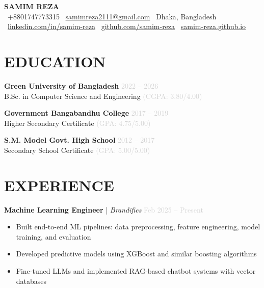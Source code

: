 \documentclass[a4paper,10pt]{article}
\begin{document}
\begin{center}
    {\Huge \textbf{SAMIM REZA}} \\[3pt]
    \color{lightgray}
    \faPhone\ +8801747773315 \quad
    \faEnvelope\ \href{mailto:samimreza2111@gmail.com}{samimreza2111@gmail.com} \quad
    \faMapMarker\ Dhaka, Bangladesh \\
    \faLinkedin\ \href{https://www.linkedin.com/in/samim-reza}{linkedin.com/in/samim-reza} \quad
    \faGithub\ \href{https://github.com/samim-reza}{github.com/samim-reza} \quad
    \faGlobe\ \href{https://samim-reza.github.io}{samim-reza.github.io}
\end{center}

\vspace{-0.2cm}

\section*{EDUCATION}
\textbf{Green University of Bangladesh} \hfill \textcolor{lightgray}{2022 -- 2026}\\
B.Sc. in Computer Science and Engineering \textcolor{lightgray}{(CGPA: 3.80/4.00)}

\textbf{Government Bangabandhu College} \hfill \textcolor{lightgray}{2017 -- 2019}\\
Higher Secondary Certificate \textcolor{lightgray}{(GPA: 4.75/5.00)}

\textbf{S.M. Model Govt. High School} \hfill \textcolor{lightgray}{2012 -- 2017}\\
Secondary School Certificate \textcolor{lightgray}{(GPA: 5.00/5.00)}

\vspace{0.1cm}

\section*{EXPERIENCE}
\textbf{Machine Learning Engineer} | \textit{Brandifies} \hfill \textcolor{lightgray}{Feb 2025 -- Present}
\begin{itemize}
    \item Built end-to-end ML pipelines: data preprocessing, feature engineering, model training, and evaluation
    \item Developed predictive models using XGBoost and similar boosting algorithms
    \item Fine-tuned LLMs and implemented RAG-based chatbot systems with vector databases
\end{itemize}
\end{document}

